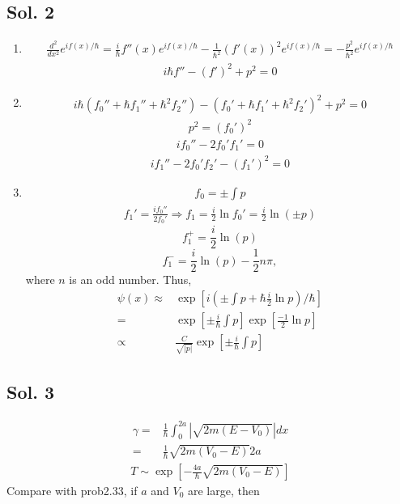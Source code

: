 \subsection*{Sol. 2}
\begin{enumerate}
    \item 
    \begin{align*}
    \frac{d^2}{dx^2}e^{if(x)/\hbar} 
    = \frac{i}{\hbar}
    f''(x)e^{if(x)/\hbar} 
    -
    \frac{1}{\hbar^2}
    (f'(x))^2e^{if(x)/\hbar} 
    = -\frac{p^2}{\hbar^2}
    e^{if(x)/\hbar} 
\end{align*}
\begin{align*}
    i\hbar f'' - (f')^2 + p^2 = 0
\end{align*}
\item 
\begin{align*}
    i\hbar(f_0''+\hbar f_1'' + \hbar^2f_2'')
    -(f_0'+\hbar f_1'+\hbar^2 f_2')^2
    +p^2 = 0
\end{align*}
\begin{align*}
    p^2 = (f_0')^2
\end{align*}
\begin{align*}
    if_0''-2f_0'f_1' = 0
\end{align*}
\begin{align*}
    if_1''-2f_0'f_2'-(f_1')^2=0
\end{align*}
\item 
\begin{align*}
    f_0 = \pm \int p
\end{align*}
\begin{align*}
    f_1' = \frac{if_0''}{2f_0'}
    \Rightarrow 
    f_1 = 
    \frac{i}{2}\ln f_0'
    =\frac{i}{2}\ln (\pm p)
\end{align*}
$$
f_1^+ = \frac{i}{2}\ln (p)
$$
$$
f_1^- = \frac{i}{2}\ln (p) - \frac{1}{2}n\pi,
$$
where $n$ is an odd number.
Thus,
\begin{align*}
    \psi(x)\approx &
    \exp\left[
    i(\pm \int p + \hbar \frac{i}{2}\ln p)/\hbar
    \right]\\
    =&
    \exp\left[
    \pm \frac{i}{\hbar}\int p 
    \right]
    \exp[\frac{-1}{2}\ln p]\\
    \propto&
    \frac{C}{\sqrt{|p|}}
    \exp\left[
    \pm \frac{i}{\hbar}\int p 
    \right]
\end{align*}


\end{enumerate}


\subsection*{Sol. 3} 
\begin{align*}
    \gamma =& \frac{1}{\hbar}
    \int_0^{2a}|\sqrt{2m(E-V_0)}|dx\\
    =&
    \frac{1}{\hbar}
    \sqrt{2m(V_0-E)}2a
\end{align*}
\begin{align*}
    T \sim
    \exp\left[-\frac{4a}{\hbar}
    \sqrt{2m(V_0-E)}\right]
\end{align*}
Compare with prob2.33, if $a$ and $V_0$ are large, then

